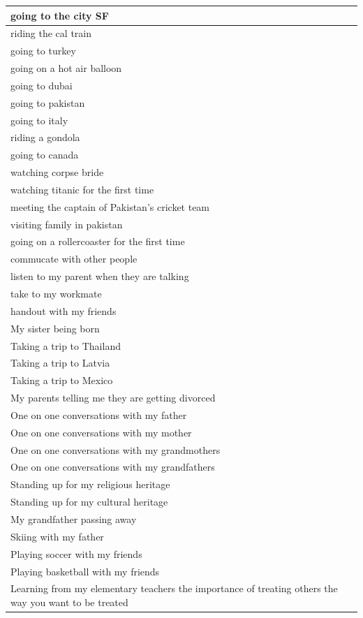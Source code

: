 \documentclass[
  .7em,
  letterpaper,
  DIV=11,
  numbers=noendperiod]{scrartcl}
\begin{document}
\begin{table}
\begin{tabular}{l}
\hline
going to the city SF\\
\hline
riding the cal train\\
\hline
going to turkey\\
\hline
going on a hot air balloon\\
\hline
going to dubai\\
\hline
going to pakistan\\
\hline
going to italy\\
\hline
riding a gondola\\
\hline
going to canada\\
\hline
watching corpse bride\\
\hline
watching titanic for the first time\\
\hline
meeting the captain of Pakistan's cricket team\\
\hline
visiting family in pakistan\\
\hline
going on a rollercoaster for the first time\\
\hline
commucate with other people\\
\hline
listen to my parent when they are talking\\
\hline
take to my workmate\\
\hline
handout with my friends\\
\hline
My sister being born\\
\hline
Taking a trip to Thailand\\
\hline
Taking a trip to Latvia\\
\hline
Taking a trip to Mexico\\
\hline
My parents telling me they are getting divorced\\
\hline
One on one conversations with my father\\
\hline
One on one conversations with my mother\\
\hline
One on one conversations with my grandmothers\\
\hline
One on one conversations with my grandfathers\\
\hline
Standing up for my religious heritage\\
\hline
Standing up for my cultural heritage\\
\hline
My grandfather passing away\\
\hline
Skiing with my father\\
\hline
Playing soccer with my friends\\
\hline
Playing basketball with my friends\\
\hline
Learning from my elementary teachers the importance of treating others the way you want to be treated\\

\end{tabular}
\end{table}
\end{document}
